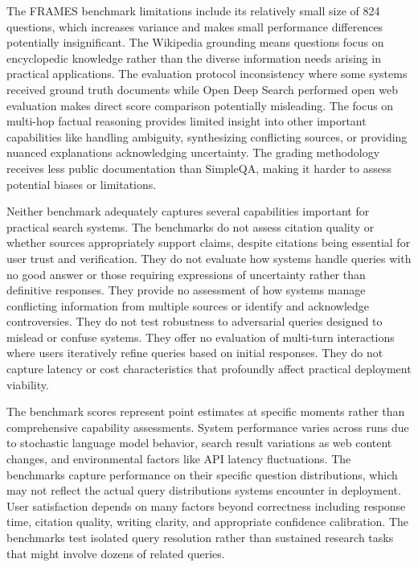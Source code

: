 The FRAMES benchmark limitations include its relatively small size of 824 questions, which increases variance and makes small performance differences potentially insignificant. The Wikipedia grounding means questions focus on encyclopedic knowledge rather than the diverse information needs arising in practical applications. The evaluation protocol inconsistency where some systems received ground truth documents while Open Deep Search performed open web evaluation makes direct score comparison potentially misleading. The focus on multi-hop factual reasoning provides limited insight into other important capabilities like handling ambiguity, synthesizing conflicting sources, or providing nuanced explanations acknowledging uncertainty. The grading methodology receives less public documentation than SimpleQA, making it harder to assess potential biases or limitations.

Neither benchmark adequately captures several capabilities important for practical search systems. The benchmarks do not assess citation quality or whether sources appropriately support claims, despite citations being essential for user trust and verification. They do not evaluate how systems handle queries with no good answer or those requiring expressions of uncertainty rather than definitive responses. They provide no assessment of how systems manage conflicting information from multiple sources or identify and acknowledge controversies. They do not test robustness to adversarial queries designed to mislead or confuse systems. They offer no evaluation of multi-turn interactions where users iteratively refine queries based on initial responses. They do not capture latency or cost characteristics that profoundly affect practical deployment viability.

The benchmark scores represent point estimates at specific moments rather than comprehensive capability assessments. System performance varies across runs due to stochastic language model behavior, search result variations as web content changes, and environmental factors like API latency fluctuations. The benchmarks capture performance on their specific question distributions, which may not reflect the actual query distributions systems encounter in deployment. User satisfaction depends on many factors beyond correctness including response time, citation quality, writing clarity, and appropriate confidence calibration. The benchmarks test isolated query resolution rather than sustained research tasks that might involve dozens of related queries.

